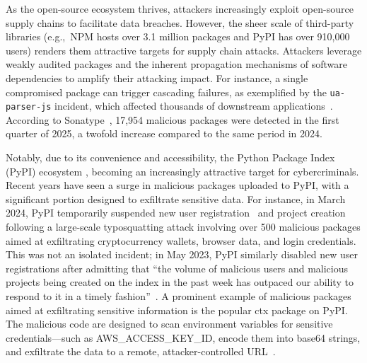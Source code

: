 As the open-source ecosystem thrives, attackers increasingly exploit open-source supply chains to facilitate data breaches.  However, the sheer scale of third-party libraries (e.g.,~NPM hosts over 3.1 million packages and PyPI has over 910,000 users) renders them attractive targets for supply chain attacks. Attackers leverage weakly audited packages and the inherent propagation mechanisms of software dependencies to amplify their attacking impact. For instance, a single compromised package can trigger cascading failures, as exemplified by the \texttt{ua-parser-js} incident, which affected thousands of downstream applications~\cite{cisa2021malware}.  
According to Sonatype~\cite{sonatypeQ12025}, 17,954 malicious packages were detected in the first quarter of 2025, a twofold increase compared to the same period in 2024. 

Notably, due to its convenience and accessibility, the Python Package Index (PyPI) ecosystem , becoming an increasingly attractive target for cybercriminals. Recent years have seen a surge in malicious packages uploaded to PyPI, with a significant portion designed to exfiltrate sensitive data. For instance, in March 2024, PyPI temporarily suspended new user registration~\cite{ArsTechnica2024PyPI} and project creation following a large-scale typosquatting attack involving over 500 malicious packages aimed at exfiltrating cryptocurrency wallets, browser data, and login credentials. This was not an isolated incident; in May 2023, PyPI similarly disabled new user registrations after admitting that ``the volume of malicious users and malicious projects being created on the index in the past week has outpaced our ability to respond to it in a timely fashion''~\cite{PyPISignsUPs}.
A prominent example of malicious packages aimed at exfiltrating sensitive information is the popular ctx package on PyPI. The malicious code are designed to scan environment variables for sensitive credentials—such as AWS\_ACCESS\_KEY\_ID, encode them into base64 strings, and exfiltrate the data to a remote, attacker-controlled URL~\cite{CrowdStrike2024}.

